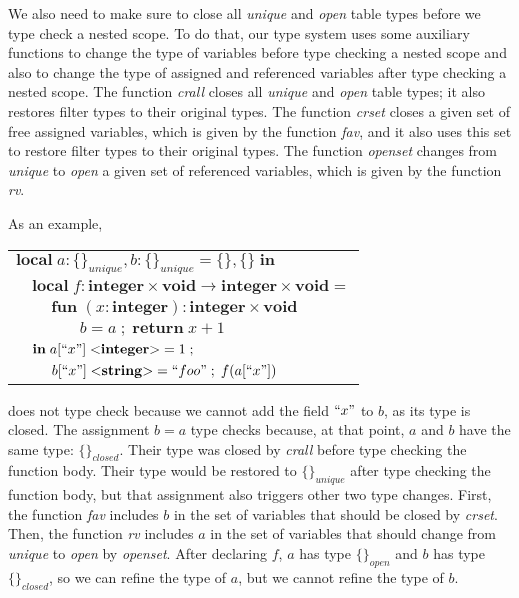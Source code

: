 \documentclass{sigplanconf}
\newcommand{\Integer}{\mathbf{integer}}
\newcommand{\String}{\mathbf{string}}
\newcommand{\Void}{\mathbf{void}}
\begin{document}
We also need to make sure to close all \emph{unique} and \emph{open}
table types before we type check a nested scope.
To do that, our type system uses some auxiliary functions to change
the type of variables before type checking a nested scope and
also to change the type of assigned and referenced variables after
type checking a nested scope.
The function \emph{crall} closes all \emph{unique} and \emph{open}
table types; it also restores filter types to their original types.
The function \emph{crset} closes a given set of free assigned variables,
which is given by the function \emph{fav}, and
it also uses this set to restore filter types to their original types.
The function \emph{openset} changes from \emph{unique} to \emph{open}
a given set of referenced variables, which is given by the function \emph{rv}.

As an example,
\begin{center}
\begin{tabular}{llll}
\multicolumn{4}{l}{$\mathbf{local} \; a:\{\}_{unique}, b:\{\}_{unique} = \{\}, \{\} \; \mathbf{in}$}\\
& \multicolumn{3}{l}{$\mathbf{local} \; f:\Integer \times \Void \rightarrow \Integer \times \Void =$}\\
& & \multicolumn{2}{l}{$\mathbf{fun} \; (x:\Integer):\Integer \times \Void$}\\
& & & \multicolumn{1}{l}{$b = a \;;\; \mathbf{return} \; x + 1$}\\
& \multicolumn{3}{l}{$\mathbf{in} \; a[``x"] \; {<}\Integer{>} = 1 \;;$}\\
& & \multicolumn{2}{l}{$b[``x"] \; {<}\String{>} = ``foo" \;;\; f(a[``x"])$}
\end{tabular}
\end{center}
does not type check because we cannot add the field
$``x"$ to $b$, as its type is closed.
The assignment $b = a$ type checks because, at that point,
$a$ and $b$ have the same type: $\{\}_{closed}$.
Their type was closed by \emph{crall} before type checking
the function body.
Their type would be restored to $\{\}_{unique}$ after type checking
the function body, but that assignment also triggers other two type changes.
First, the function \emph{fav} includes $b$ in the set of variables
that should be closed by \emph{crset}.
Then, the function \emph{rv} includes $a$ in the set of variables
that should change from \emph{unique} to \emph{open} by \emph{openset}.
After declaring $f$, $a$ has type $\{\}_{open}$ and $b$ has type $\{\}_{closed}$,
so we can refine the type of $a$, but we cannot refine the type of $b$.
\end{document}
